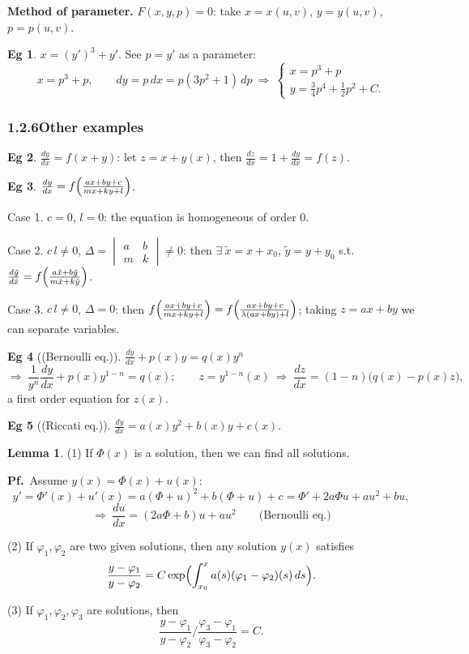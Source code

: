 \documentclass[11pt]{article}
\theoremstyle{definition}
\newtheorem*{lemma}{Lemma}
\newtheorem*{example}{Eg}
\theoremstyle{remark}
\newcommand{\subsecn}[1]{\subsubsection*{#1}}
\begin{document}
\textbf{Method of parameter.} $F(x, y, p) = 0$: take $x = x(u,v)$, $y = y(u,v)$, $p = p(u,v)$.

\begin{example}
$x = (y')^3 + y'$. See $p = y'$ as a parameter:
\[
x = p^3 + p, \qquad dy = p\,dx = p(3p^2+1)\,dp
\ \Rightarrow\ \begin{cases} x = p^3 + p \\ y = \frac{3}{4}p^4 + \frac{1}{2}p^2 + C. \end{cases}
\]
\end{example}

\subsecn{1.2.6\quad Other examples}

\begin{example}
$\frac{dy}{dx} = f(x+y)$: let $z = x + y(x)$, then $\frac{dz}{dx} = 1 + \frac{dy}{dx} = f(z)$.
\end{example}

\begin{example}
$\frac{dy}{dx} = f\Bigl(\frac{ax+by+c}{mx+ky+l}\Bigr)$.

Case 1. $c = 0$, $l = 0$: the equation is homogeneous of order 0.

Case 2. $c\,l \neq 0$, $\Delta = \begin{vmatrix} a & b \\ m & k \end{vmatrix} \neq 0$: then
$\exists\ \tilde{x} = x + x_0$, $\tilde{y} = y + y_0$ s.t.
$\frac{d\tilde{y}}{d\tilde{x}} = f\Bigl(\frac{a\tilde{x} + b\tilde{y}}{m\tilde{x} + k\tilde{y}}\Bigr)$.

Case 3. $c\,l \neq 0$, $\Delta = 0$: then
$f\Bigl(\frac{ax+by+c}{mx+ky+l}\Bigr) = f\Bigl(\frac{ax+by+c}{\lambda(ax+by)+l}\Bigr)$;
taking $z = ax + by$ we can separate variables.
\end{example}

\begin{example}[(Bernoulli eq.)]
$\frac{dy}{dx} + p(x)y = q(x)y^n$
\[
\Rightarrow\ \frac{1}{y^n}\frac{dy}{dx} + p(x)y^{1-n} = q(x);
\qquad z = y^{1-n}(x) \ \Rightarrow\ \frac{dz}{dx} = (1-n)\bigl(q(x) - p(x)z\bigr),
\]
a first order equation for $z(x)$.
\end{example}

\begin{example}[(Riccati eq.)]
$\frac{dy}{dx} = a(x)y^2 + b(x)y + c(x)$.

\begin{lemma}
(1) If $\Phi(x)$ is a solution, then we can find all solutions.

\textbf{Pf.}\ Assume $y(x) = \Phi(x) + u(x)$:
\[
y' = \Phi'(x) + u'(x) = a(\Phi+u)^2 + b(\Phi+u) + c = \Phi' + 2a\Phi u + au^2 + bu,
\]
\[
\Rightarrow\ \frac{du}{dx} = (2a\Phi + b)u + au^2 \qquad \text{(Bernoulli eq.)}
\]

(2) If $\varphi_1, \varphi_2$ are two given solutions, then any solution $y(x)$ satisfies
\[
\frac{y-\varphi_1}{y-\varphi_2} = C\exp\Bigl(\int_{x_0}^{x} a(s)(\varphi_1-\varphi_2)(s)\,ds\Bigr).
\]

(3) If $\varphi_1, \varphi_2, \varphi_3$ are solutions, then
\[
\frac{y-\varphi_1}{y-\varphi_2}\Big/\frac{\varphi_3-\varphi_1}{\varphi_3-\varphi_2} = C.
\]
\end{lemma}
\end{example}
\end{document}
